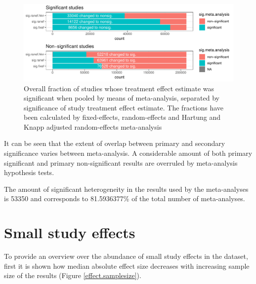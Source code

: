 \documentclass[11pt,a4paper,twoside]{book}\usepackage[]{graphicx}\usepackage[]{color}
\newenvironment{knitrout}{}{} %
\begin{document}
\begin{figure}
\begin{knitrout}
\color{fgcolor}

{\centering \includegraphics[width=\textwidth-3cm]{figure/ch02_figunnamed-chunk-14-1} 

}



\end{knitrout}
\caption{Overall fraction of studies whose treatment effect estimate was significant when pooled by means of meta-analysis, separated by significance of study treatment effect estimate. The fractions have been calculated
by fixed-effects, random-effects and Hartung and Knapp adjusted random-effects meta-analysis}
\label{primary.secondary.significance}
\end{figure}

It can be seen that the extent of overlap between primary and secondary significance varies between meta-analysis. A considerable amount of both primary significant and primary non-significant results are overruled by meta-analysis hypothesis tests. 


The amount of significant heterogeneity in the results used by the meta-analyses is 53350 and corresponds to 81.5936377\% of the total number of meta-analyses.




\section{Small study effects}



To provide an overview over the abundance of small study effects in the dataset, first it is shown how median absolute effect size decreases with increasing sample size of the results (Figure \ref{effect.samplesize}). 
\end{document}
